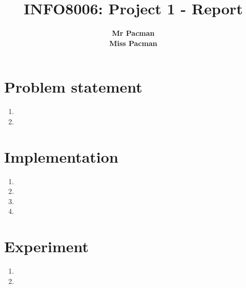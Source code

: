 \documentclass{article}
\begin{document}

\title{\Large{INFO8006: Project 1 - Report}}
\vspace{1cm}
\author{\small{\bf Mr Pacman} \\ \small{\bf Miss Pacman}}

\maketitle


\section{Problem statement}

\begin{enumerate}[label=\alph*.]
    \item 
    \item
\end{enumerate}

\section{Implementation}

\begin{enumerate}[label=\alph*.]
    \item 
    \item
    \item
    \item
\end{enumerate}

\section{Experiment}

\begin{enumerate}[label=\alph*.]
    \item 
    \item
\end{enumerate}






\end{document}
